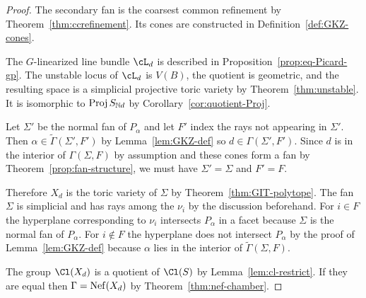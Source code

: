 \documentclass{article}
\begin{document}
\begin{proof}
  The secondary fan is the coarsest common refinement by Theorem~\ref{thm:ccrefinement}.  Its cones are constructed in Definition~\ref{def:GKZ-cones}.

  The $G$-linearized line bundle $\cL_d$ is described in Proposition~\ref{prop:eq-Picard-gp}.  The unstable locus of $\cL_d$ is $V(B)$, the quotient is geometric, and the resulting space is a simplicial projective toric variety by Theorem~\ref{thm:unstable}.  It is isomorphic to $\operatorname{Proj} S_{\mathbb N d}$ by Corollary~\ref{cor:quotient-Proj}.

  Let $\Sigma'$ be the normal fan of $P_\alpha$ and let $F'$ index the rays not appearing in $\Sigma'$.  Then $\alpha\in\tilde\Gamma(\Sigma',F')$ by Lemma~\ref{lem:GKZ-def} so $d\in\Gamma(\Sigma',F')$.  Since $d$ is in the interior of $\Gamma(\Sigma,F)$ by assumption and these cones form a fan by Theorem~\ref{prop:fan-structure}, we must have $\Sigma'=\Sigma$ and $F'=F$.

  Therefore $X_d$ is the toric variety of $\Sigma$ by Theorem~\ref{thm:GIT-polytope}.  The fan $\Sigma$ is simplicial and has rays among the $\nu_i$ by the discussion beforehand.  For $i\in F$ the hyperplane corresponding to $\nu_i$ intersects $P_\alpha$ in a facet because $\Sigma$ is the normal fan of $P_\alpha$.  For $i\notin F$ the hyperplane does not intersect $P_\alpha$ by the proof of Lemma~\ref{lem:GKZ-def} because $\alpha$ lies in the interior of $\tilde\Gamma(\Sigma,F)$.

  The group $\Cl(X_d)$ is a quotient of $\Cl(S)$ by Lemma~\ref{lem:cl-restrict}.  If they are equal then $\Gamma=\operatorname{Nef}(X_d)$ by Theorem~\ref{thm:nef-chamber}.
\end{proof}

\ifdefined\whole
\else


\end{document}
